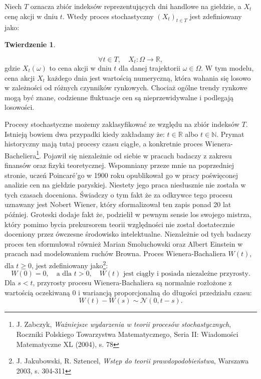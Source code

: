 Niech \(T\) oznacza zbiór indeksów reprezentujących dni handlowe na giełdzie, a \(X_t\) cenę akcji w dniu \(t\). Wtedy proces stochastyczny \((X_t)_{t \in T}\) jest zdefiniowany jako:
\newtheorem{theorem}{Twierdzenie}
\newtheorem{lemma}[theorem]{Lemat}
\newtheorem{definition}[theorem]{Definicja}
\begin{theorem}
\end{theorem}

\begin{equation}
\forall t \in T, \quad X_t: \Omega \to \mathbb{R},
\end{equation}
gdzie \(X_t(\omega)\) to cena akcji w dniu \(t\) dla danej trajektorii \(\omega \in \Omega\). 
W tym modelu, cena akcji \(X_t\) każdego dnia jest wartością numeryczną, która wahania się losowo w zależności od różnych czynników rynkowych. Chociaż ogólne trendy rynkowe mogą być znane, codzienne fluktuacje cen są nieprzewidywalne i podlegają losowości.

Procesy stochastyczne możemy zaklasyfikować ze względu na zbiór indeksów \(T\). Istnieją bowiem dwa przypadki kiedy zakładamy że: \( t \in \mathbb{R} \) albo \( t \in \mathbb{N} \). Prymat historyczny mają tutaj procesy czasu ciągłe, a konkretnie proces Wienera-Bacheliera\footnote{J. Zabczyk, \textit{Ważniejsze wydarzenia w teorii procesów stochastycznych}, Roczniki Polskiego Towarzystwa Matematycznego, Seria II: Wiadomości Matematyczne XL (2004), s. 78}. Pojawił się niezależnie od siebie w pracach badaczy z zakresu finansów oraz fizyki teoretycznej. Wspomniany przeze mnie na poprzedniej stronie, uczeń Poincaré'go w 1900 roku opublikował go w pracy poświęconej analizie cen na giełdzie paryskiej. Niestety jego praca niesłusznie nie została w tych czasach doceniona. Świadczy o tym fakt że za odkrywce tego procesu uznawany jest Nobert Wiener, który sformalizował ten zapis ponad 20 lat później. Groteski dodaje fakt że, podzielił w pewnym sensie los swojego mistrza, który pomimo bycia prekursorem teorii względności nie został dostatecznie doceniony przez ówczesne środowisko intelektualne. Niezależnie od tych badaczy proces ten sformułował również Marian Smoluchowski oraz Albert Einstein w pracach nad modelowaniem ruchów Browna. Proces Wienera-Bachaliera \( W(t) \), dla \( t \geq 0 \), jest zdefiniowany jako\footnote{J. Jakubowski, R. Sztencel, \textit{Wstęp do teorii prawdopodobieństwa}, Warszawa 2003, s. 304-311}:
\begin{equation}
    W(0) = 0, \quad \text{a dla } t > 0, \quad W(t) \text{ jest ciągły i posiada niezależne przyrosty.}
\end{equation}
Dla \( s < t \), przyrosty procesu Wienera-Bachaliera są normalnie rozłożone z wartością oczekiwaną 0 i wariancją proporcjonalną do długości przedziału czasu:
\begin{equation}
    W(t) - W(s) \sim \mathcal{N}(0, t - s).
\end{equation}

